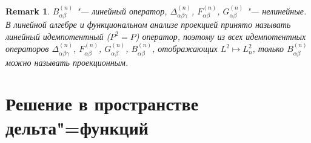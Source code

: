 \documentclass{article}
\newtheorem{remark}{Remark}
\begin{document}
\begin{remark}
    \(B^{(n)}_{\alpha\beta}\) "--- линейный оператор,
    \(\Delta^{(n)}_{\alpha\beta\gamma}\), \(F^{(n)}_{\alpha\beta}\), \(G^{(n)}_{\alpha\beta}\) "--- нелинейные.
    В линейной алгебре и функциональном анализе проекцией принято называть линейный идемпотентный (\(P^2=P\)) оператор,
    поэтому из всех идемпотентных операторов
    \(\Delta^{(n)}_{\alpha\beta\gamma}\), \(F^{(n)}_{\alpha\beta}\), \(G^{(n)}_{\alpha\beta}\), \(B^{(n)}_{\alpha\beta}\),
    отображающих \(L^2 \mapsto L^2_n\), только \(B^{(n)}_{\alpha\beta}\) можно называть проекционным.
\end{remark}

\section{Решение в пространстве дельта"=функций}
\end{document}
